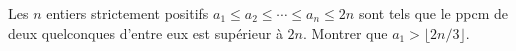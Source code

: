 Les $n$ entiers strictement positifs $a_1 \leq a_2 \leq \cdots \leq a_n \leq 2n$ sont tels que le ppcm de deux quelconques d'entre eux est supérieur à $2n$. Montrer que $a_1 > \lfloor 2n/3 \rfloor$.
